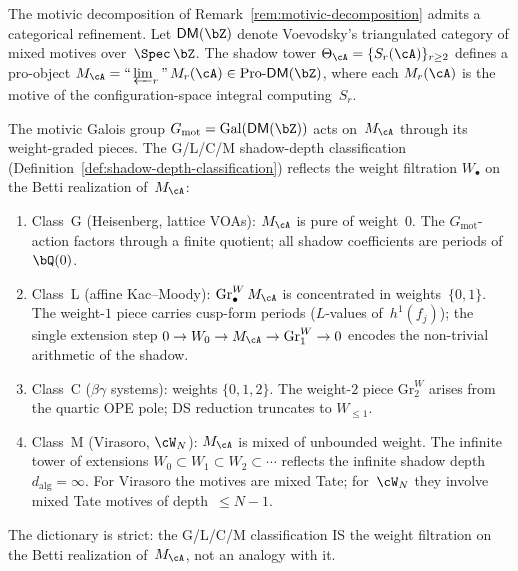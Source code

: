 \begin{remark}%
\label{rem:shadow-tower-dm-z}%
\ClaimStatusHeuristic%
%
%
%
The motivic decomposition of
Remark~\ref{rem:motivic-decomposition} admits a categorical
refinement. Let $\mathsf{DM}(\bZ)$ denote Voevodsky's triangulated
category of mixed motives over~$\Spec\,\bZ$.
The shadow tower $\Theta_\cA = \{S_r(\cA)\}_{r \geq 2}$
defines a pro-object
$M_\cA = ``\varprojlim_r"\, M_r(\cA) \in \mathrm{Pro}\text{-}\mathsf{DM}(\bZ)$,
where each $M_r(\cA)$ is the motive of the configuration-space
integral computing~$S_r$.

The motivic Galois group
$G_{\mathrm{mot}} = \mathrm{Gal}(\mathsf{DM}(\bZ))$
acts on~$M_\cA$ through its weight-graded pieces.
The G/L/C/M shadow-depth classification
\textup{(}Definition~\ref{def:shadow-depth-classification}\textup{)}
reflects the weight filtration $W_\bullet$ on the
Betti realization of~$M_\cA$:
\begin{enumerate}[label=\textup{(\roman*)}]
\item Class~G \textup{(}Heisenberg, lattice VOAs\textup{):}
 $M_\cA$ is pure of weight~$0$.
 The $G_{\mathrm{mot}}$-action factors through a finite quotient;
 all shadow coefficients are periods of~$\bQ(0)$.
\item Class~L \textup{(}affine Kac--Moody\textup{):}
 $\mathrm{Gr}^W_\bullet\,M_\cA$ is concentrated in
 weights~$\{0,1\}$.
 The weight-$1$ piece carries cusp-form periods
 \textup{(}$L$-values of~$h^1(f_j)$\textup{)};
 the single extension step $0 \to W_0 \to M_\cA \to
 \mathrm{Gr}^W_1 \to 0$ encodes the non-trivial
 arithmetic of the shadow.
\item Class~C \textup{(}$\beta\gamma$ systems\textup{):}
 weights $\{0,1,2\}$.
 The weight-$2$ piece $\mathrm{Gr}^W_2$ arises from
 the quartic OPE pole;
 DS reduction truncates to $W_{\leq 1}$.
\item Class~M \textup{(}Virasoro, $\cW_N$\textup{):}
 $M_\cA$ is mixed of unbounded weight.
 The infinite tower of extensions
 $W_0 \subset W_1 \subset W_2 \subset \cdots$
 reflects the infinite shadow depth~$d_{\mathrm{alg}} = \infty$.
 For Virasoro the motives are mixed Tate;
 for~$\cW_N$ they involve mixed Tate motives of
 depth~$\leq N{-}1$.
\end{enumerate}
The dictionary is strict: the G/L/C/M classification IS the weight
filtration on the Betti realization of~$M_\cA$, not an analogy with it.

\end{remark}
